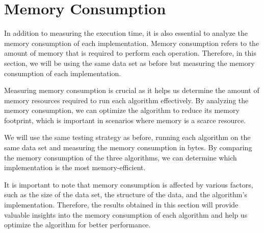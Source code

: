 \section{Memory Consumption}
In addition to measuring the execution time, it is also essential to analyze the memory consumption of each implementation. Memory consumption refers to the amount of memory that is required to perform each operation. Therefore, in this section, we will be using the same data set as before but measuring the memory consumption of each implementation.

Measuring memory consumption is crucial as it helps us determine the amount of memory resources required to run each algorithm effectively. By analyzing the memory consumption, we can optimize the algorithm to reduce its memory footprint, which is important in scenarios where memory is a scarce resource.

We will use the same testing strategy as before, running each algorithm on the same data set and measuring the memory consumption in bytes. By comparing the memory consumption of the three algorithms, we can determine which implementation is the most memory-efficient.

It is important to note that memory consumption is affected by various factors, such as the size of the data set, the structure of  the data, and the algorithm's implementation. Therefore, the results obtained in this section will provide valuable insights into the memory consumption of each algorithm and help us optimize the algorithm for better performance.

